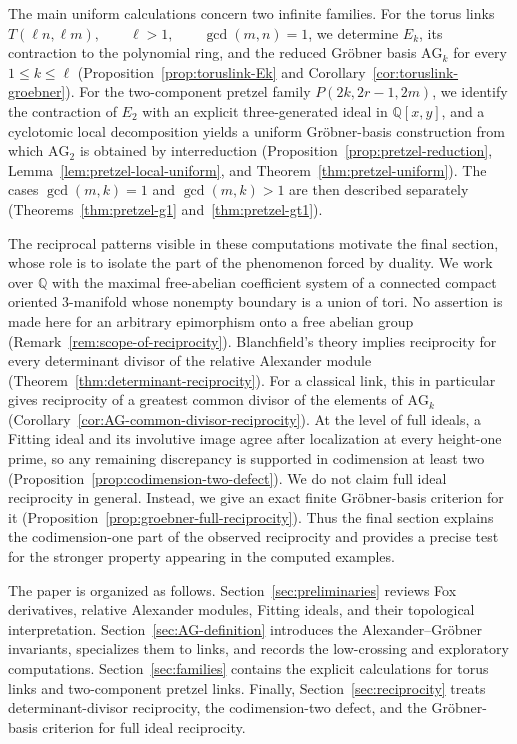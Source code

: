 \documentclass{article}
\theoremstyle{definition}
\theoremstyle{plain}
\newcommand{\Q}{{\mathbb{Q}}}
\DeclareMathOperator{\gcdop}{gcd}
\newcommand{\AG}{\mathrm{AG}}
\begin{document}
The main uniform calculations concern two infinite families.  For the
torus links
$  T(\ell n,\ell m),
 \qquad \ell>1,\qquad \gcdop(m,n)=1$,
we determine \(E_k\), its contraction to the polynomial ring, and the
reduced Gr\"obner basis \(\AG_k\) for every \(1\le k\le\ell\)
(Proposition~\ref{prop:toruslink-Ek} and
Corollary~\ref{cor:toruslink-groebner}).  For the two-component pretzel
family $
 P(2k,2r-1,2m)$,
we identify the contraction of \(E_2\) with an explicit three-generated
ideal in \(\Q[x,y]\), and a cyclotomic local decomposition yields a
uniform Gr\"obner-basis construction from which \(\AG_2\) is obtained by
interreduction (Proposition~\ref{prop:pretzel-reduction},
Lemma~\ref{lem:pretzel-local-uniform}, and
Theorem~\ref{thm:pretzel-uniform}).  The cases
\(\gcdop(m,k)=1\) and \(\gcdop(m,k)>1\) are then described separately
(Theorems~\ref{thm:pretzel-g1} and~\ref{thm:pretzel-gt1}).

The reciprocal patterns visible in these computations motivate the final
section, whose role is to isolate the part of the phenomenon forced by
duality.  We work over \(\Q\) with the maximal free-abelian coefficient
system of a connected compact oriented \(3\)-manifold whose nonempty
boundary is a union of tori.  No assertion is made here for an arbitrary
epimorphism onto a free abelian group
(Remark~\ref{rem:scope-of-reciprocity}).  Blanchfield's theory implies
reciprocity for every determinant divisor of the relative Alexander module
(Theorem~\ref{thm:determinant-reciprocity}).  For a classical link, this in
particular gives reciprocity of a greatest common divisor of the elements
of \(\AG_k\) (Corollary~\ref{cor:AG-common-divisor-reciprocity}).  At the
level of full ideals, a Fitting ideal and its involutive image agree after
localization at every height-one prime, so any remaining discrepancy is
supported in codimension at least two
(Proposition~\ref{prop:codimension-two-defect}).  We do not claim full
ideal reciprocity in general.  Instead, we give an exact finite
Gr\"obner-basis criterion for it
(Proposition~\ref{prop:groebner-full-reciprocity}).  Thus the final section
explains the codimension-one part of the observed reciprocity and provides
a precise test for the stronger property appearing in the computed
examples.

The paper is organized as follows.  Section~\ref{sec:preliminaries}
reviews Fox derivatives, relative Alexander modules, Fitting ideals, and
their topological interpretation.  Section~\ref{sec:AG-definition}
introduces the Alexander--Gr\"obner invariants, specializes them to links,
and records the low-crossing and exploratory computations.
Section~\ref{sec:families} contains the explicit calculations for torus
links and two-component pretzel links.  Finally,
Section~\ref{sec:reciprocity} treats determinant-divisor reciprocity, the
codimension-two defect, and the Gr\"obner-basis criterion for full ideal
reciprocity.
\end{document}
